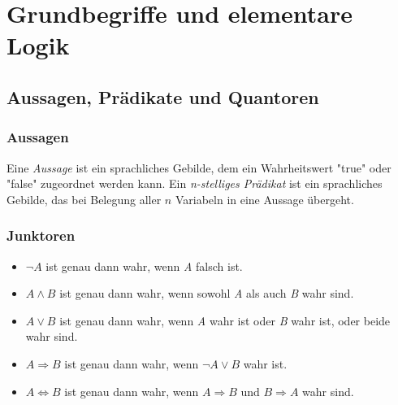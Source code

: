 \section{Grundbegriffe und elementare Logik}

\subsection{Aussagen, Prädikate und Quantoren}
\subsubsection{Aussagen}
\begin{minipage}{0.9\linewidth}
Eine \textit{Aussage} ist ein sprachliches Gebilde, dem ein Wahrheitswert "true" oder "false" zugeordnet werden	kann.
Ein \textit{n-stelliges Prädikat} ist ein sprachliches Gebilde, das bei Belegung aller $n$ Variabeln in eine Aussage übergeht.
\end{minipage}

\subsubsection{Junktoren}%
\label{ssub:Junktoren}
\begin{minipage}{0.9\linewidth}
\begin{itemize}
\item $\neg A$ ist genau dann wahr, wenn \textit{A} falsch ist.
\item $A  \land B$ ist genau dann wahr, wenn sowohl 
\textit{A} als auch \textit{B} wahr sind.
\item $A \lor B$ ist genau dann wahr, wenn \textit{A} wahr ist oder \textit{B} wahr ist, oder beide wahr sind.
\item $A \Rightarrow B$ ist genau dann wahr, wenn $\neg A \lor B$ wahr ist.
\item $A \Leftrightarrow B$ ist genau dann wahr, wenn $A \Rightarrow B$ und $B \Rightarrow A$ wahr sind.
\end{itemize}
\end{minipage}

